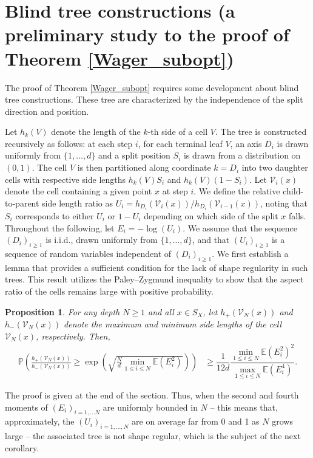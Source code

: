 \documentclass[paper=a4, fontsize=11pt]{scrartcl}
\newcommand{\PP}{\mathbb{P}}
\newcommand{\EE}{\mathbb{E}}
\newtheorem{proposition}[theorem]{Proposition}
\begin{document}
\section{Blind tree constructions (a preliminary study to the proof of Theorem \ref{Wager_subopt})} \label{sec_sub}

The proof of Theorem \ref{Wager_subopt} requires some development about blind tree constructions. These tree are characterized by the independence of the split direction and position.


Let $h_{k}(V)$ denote the length of the $k$-th side of a cell $V$. The tree is constructed recursively as follows: at each step $i$, for each terminal leaf $V$, an axis $D_i$ is drawn uniformly from $\{1, \dots, d\}$ and a split position $S_i$ is drawn from a distribution on $(0, 1)$. The cell $V$ is then partitioned along coordinate $k = D_i$ into two daughter cells with respective side lengths $h_{k}(V) S_i$ and $h_{k}(V)(1-S_i)$. Let $\mathcal{V}_i(x)$ denote the cell containing a given point $x$ at step $i$. We define the relative child-to-parent side length ratio as $U_i = h_{D_i}(\mathcal{V}_i(x)) / h_{D_i}(\mathcal{V}_{i-1}(x))$, noting that $S_i$ corresponds to either $U_i$ or $1 - U_i$ depending on which side of the split $x$ falls. Throughout the following, let $E_i = -\log(U_i)$. We assume that the sequence $(D_i)_{i \geq 1}$ is i.i.d., drawn uniformly from $\{1, \dots, d\}$, and that $(U_i)_{i \geq 1}$ is a sequence of random variables independent of $(D_i)_{i \geq 1}$. We first establish a lemma that provides a sufficient condition for the lack of shape regularity in such trees. This result utilizes the Paley–Zygmund inequality to show that the aspect ratio of the cells remains large with positive probability.

\begin{proposition}\label{lemmaPZ}
For any depth $N \geq 1$ and all $x \in S_X$, let $h_+(\mathcal{V}_N(x))$ and $h_-(\mathcal{V}_N(x))$ denote the maximum and minimum side lengths of the cell $\mathcal{V}_N(x)$, respectively. Then,
    \begin{align*}
\PP\left(\frac{h_+(\mathcal V _ N (x) )}{h_-(\mathcal V_N  (x) )} 
\geq \exp\left(\sqrt{\frac{N}{d} \min_{1 \leq i \leq N} \mathbb{E}(E_i^2)}\right)\right) &\geq \dfrac{1}{12d} \dfrac{\min_{1 \leq i \leq N} \EE(E_i ^2)^2}{\max_{1 \leq i \leq N} \mathbb{E}(E_i ^4) }.    
\end{align*} 
\end{proposition}

The proof is given at the end of the section. Thus, when the second and fourth moments of $(E_i)_{i=1, \dots N}$ are uniformly bounded in $N$ -- this means that, approximately, the $(U_i)_{i=1, \dots, N}$ are on average far from 0 and 1 as $N$ grows large -- the associated tree is not shape regular, which is the subject of the next corollary.
\end{document}
